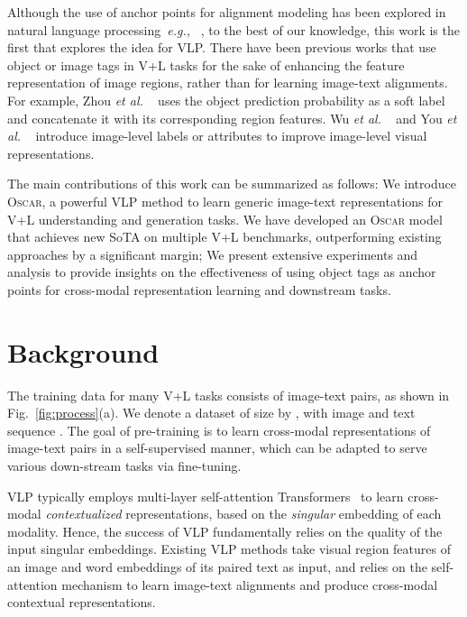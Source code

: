 \documentclass[runningheads]{llncs}
\newcommand{\ea}[0]{\emph{et al. }}
\newcommand{\eg}[0]{\emph{e.g., }}
\newcommand{\short}{\textsc{Oscar}}
\begin{document}
Although the use of anchor points for alignment modeling has been explored in natural language processing~\eg~\cite{brown1991aligning}, to the best of our knowledge, this work is the first that explores the idea for VLP. There have been previous works that use object or image tags in V+L tasks for the sake of enhancing the feature representation of image regions, rather than for learning image-text alignments. For example, Zhou \ea~\cite{zhou2019unified} uses the object prediction probability as a soft label and concatenate it with its corresponding region features. Wu \ea~\cite{wu2016value} and You \ea~\cite{you2016image} introduce image-level labels or attributes to improve image-level visual representations.









The main contributions of this work can be summarized as follows:
 We introduce \short{}, a powerful VLP method to learn generic image-text representations for V+L understanding and generation tasks.
 We have developed an \short{} model that achieves new SoTA on multiple V+L benchmarks, outperforming existing approaches by a significant margin; 
 We present extensive experiments and analysis to provide insights on the effectiveness of using object tags as anchor points for cross-modal representation learning and downstream tasks.











 




\vspace{-4mm}
\section{Background}
\vspace{-2mm}

The training data for many V+L tasks consists of image-text pairs, as shown in Fig.~\ref{fig:process}(a). We denote a dataset of size  by , with image  and text sequence . The goal of pre-training is to learn cross-modal representations of image-text pairs in a self-supervised manner, which can be adapted to serve various down-stream tasks via fine-tuning. 

VLP typically employs multi-layer self-attention Transformers~\cite{vaswani2017attention} to learn cross-modal {\it contextualized} representations, based on the {\it singular} embedding of each modality. 
Hence, the success of VLP fundamentally relies on the quality of the input singular embeddings. 
Existing VLP methods take visual region features  of an image and word embeddings  of its paired text as input, and relies on the self-attention mechanism to learn image-text alignments and produce cross-modal contextual representations.  
\end{document}
